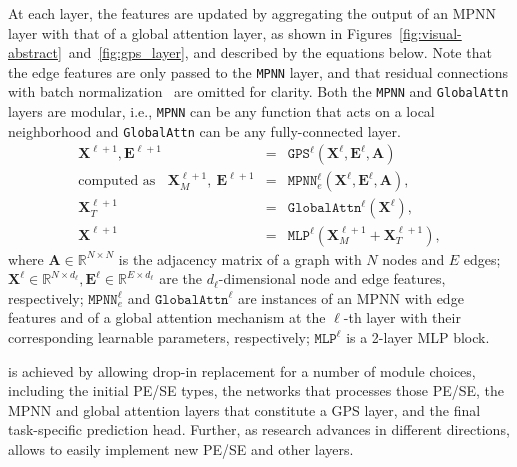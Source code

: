 \documentclass{article}
\begin{document}
\newcommand{\mpnn}{\texttt{MPNN}\xspace}
\newcommand{\attn}{\texttt{GlobalAttn}\xspace}
\newcommand{\X}{\mathbf{X}}
\newcommand{\E}{\mathbf{E}}
\newcommand{\A}{\mathbf{A}}
At each layer, the features are updated by aggregating the output of an MPNN layer with that of a global attention layer, as shown in Figures~\ref{fig:visual-abstract}~and~\ref{fig:gps_layer}, and described by the equations below. Note that the edge features are only passed to the \mpnn layer, and that residual connections with batch normalization~\cite{ioffe2015batchnorm} are omitted for clarity. Both the \mpnn and \attn layers are modular, i.e., \mpnn can be any function that acts on a local neighborhood and \attn can be any fully-connected layer.
\vspace{-3pt}
\begin{eqnarray}
    \X^{\ell+1}, \E^{\ell+1} &=& \texttt{GPS}^{\ell} \left( \X^{\ell}, \E^{\ell}, \A \right)\\
    \textrm{computed as} \ \ \ \ 
    \X^{\ell+1}_M, \ \E^{\ell+1} &=& \mpnn_e^{\ell} \left(\X^{\ell}, \E^{\ell}, \A \right),\\
    \X^{\ell+1}_T
    &=&  \attn^{\ell} \left(\X^{\ell}  \right),\\
    \X^{\ell+1} &=&
    \texttt{MLP}^{\ell}\left(\X^{\ell+1}_M + \X^{\ell+1}_T\right),
    \label{eqn:layer_equation}
\end{eqnarray}
where $\A \in \mathbb{R}^{N \times N}$ is the adjacency matrix of a graph with $N$ nodes and $E$ edges; $\X^{\ell} \in \mathbb{R}^{N \times d_\ell}, \E^{\ell} \in \mathbb{R}^{E \times d_\ell}$ are the $d_\ell$-dimensional node and edge features, respectively; $\mpnn_e^{\ell}$ and $\attn^{\ell}$ are instances of an MPNN with edge features and of a global attention mechanism at the $\ell$-th layer with their corresponding learnable parameters, respectively; $\texttt{MLP}^{\ell}$ is a 2-layer MLP block.

 is achieved by allowing drop-in replacement for a number of module choices, including the initial PE/SE types, the networks that processes those PE/SE, the MPNN and global attention layers that constitute a GPS layer, and the final task-specific prediction head. Further, as research advances in different directions, \gtgym allows to easily implement new PE/SE and other layers.
\end{document}

